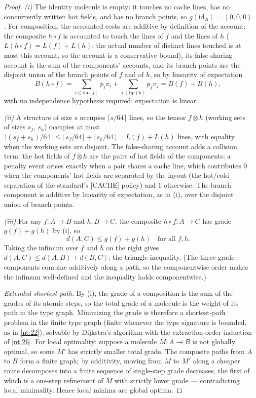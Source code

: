 \begin{proof}
\emph{(i)} The identity molecule is empty: it touches no cache lines,
has no concurrently written hot fields, and has no branch points, so
$g(\mathrm{id}_A) = (0,0,0)$. For composition, the accounted costs are
additive by definition of the account: the composite $h \circ f$ is
accounted to touch the lines of $f$ and the lines of $h$ ($L(h \circ f)
= L(f) + L(h)$; the actual number of distinct lines touched is at most
this account, so the account is a conservative bound), its false-sharing
account is the sum of the components' accounts, and its branch points
are the disjoint union of the branch points of $f$ and of $h$, so by
linearity of expectation
\[ B(h \circ f) = \sum_{i \in \mathrm{bp}(f)} p_i \pi_i +
\sum_{j \in \mathrm{bp}(h)} p_j \pi_j = B(f) + B(h), \]
with no independence hypothesis required: expectation is linear.

\emph{(ii)} A structure of size $s$ occupies $\lceil s/64 \rceil$ lines,
so the tensor $f \otimes h$ (working sets of sizes $s_f$, $s_h$)
occupies at most $\lceil (s_f + s_h)/64 \rceil \le \lceil s_f/64 \rceil +
\lceil s_h/64 \rceil = L(f) + L(h)$ lines, with equality when the
working sets are disjoint. The false-sharing account adds a collision
term: the hot fields of $f \otimes h$ are the pairs of hot fields of the
components; a penalty event arises exactly when a pair shares a cache
line, which contributes $0$ when the components' hot fields are
separated by the layout (the hot/cold separation of the standard's
[CACHE] policy) and $1$ otherwise. The branch component is additive by
linearity of expectation, as in (i), over the disjoint union of branch
points.

\emph{(iii)} For any $f \colon A \to B$ and $h \colon B \to C$, the
composite $h \circ f \colon A \to C$ has grade $g(f) + g(h)$ by (i), so
\[ d(A,C) \le g(f) + g(h) \quad\text{for all } f, h. \]
Taking the infimum over $f$ and $h$ on the right gives $d(A,C) \le
d(A,B) + d(B,C)$: the triangle inequality. (The three grade components
combine additively along a path, so the componentwise order makes the
infimum well-defined and the inequality holds componentwise.)

\emph{Extended shortest-path.} By (i), the grade of a composition is the
sum of the grades of its atomic steps, so the total grade of a molecule
is the weight of its path in the type graph. Minimizing the grade is
therefore a shortest-path problem in the finite type graph (finite
whenever the type signature is bounded, as in \ref{nt:22}), solvable by
Dijkstra's algorithm with the extraction-order induction of \ref{nt:26}.
For local optimality: suppose a molecule $M \colon A \to B$ is not
globally optimal, so some $M'$ has strictly smaller total grade. The
composite paths from $A$ to $B$ form a finite graph; by additivity,
moving from $M$ to $M'$ along a cheaper route decomposes into a finite
sequence of single-step grade decreases, the first of which is a
one-step refinement of $M$ with strictly lower grade --- contradicting
local minimality. Hence local minima are global optima.
\end{proof}

